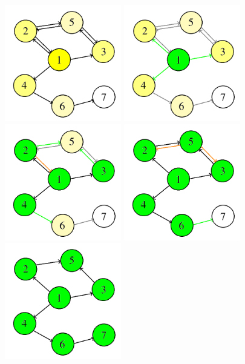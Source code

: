 \begin{figure}[h]
\centering
\includegraphics[width=2in]{Images/3/graph}
\includegraphics[width=2in]{Images/3/tree-2-step-1}
\includegraphics[width=2in]{Images/3/tree-2-step-2}
\includegraphics[width=2in]{Images/3/tree-2-step-3}
\includegraphics[width=2in]{Images/3/tree-2-step-4}

\end{figure}
